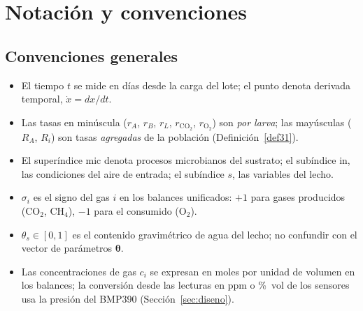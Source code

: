\section{Notación y convenciones}\label{sec:notacion}

\subsection{Convenciones generales}

\begin{itemize}
  \item El tiempo $t$ se mide en días desde la carga del lote; el punto
  denota derivada temporal, $\dot x = dx/dt$.
  \item Las tasas en minúscula ($r_A$, $r_B$, $r_L$, $r_{\mathrm{CO_2}}$,
  $r_{\mathrm{O_2}}$) son \emph{por larva}; las mayúsculas ($R_A$, $R_i$) son
  tasas \emph{agregadas} de la población (Definición~\ref{def31}).
  \item El superíndice $\mathrm{mic}$ denota procesos microbianos del
  sustrato; el subíndice $\mathrm{in}$, las condiciones del aire de entrada;
  el subíndice $s$, las variables del lecho.
  \item $\sigma_i$ es el signo del gas $i$ en los balances unificados:
  $+1$ para gases producidos (CO$_2$, CH$_4$), $-1$ para el consumido
  (O$_2$).
  \item $\theta_s \in [0,1]$ es el contenido gravimétrico de agua del lecho;
  no confundir con el vector de parámetros $\boldsymbol{\theta}$.
  \item Las concentraciones de gas $c_i$ se expresan en moles por unidad de
  volumen en los balances; la conversión desde las lecturas en ppm o \%~vol
  de los sensores usa la presión del BMP390 (Sección~\ref{sec:diseno}).
\end{itemize}


